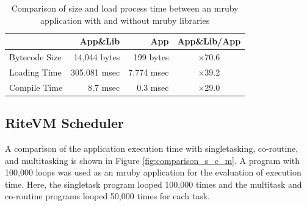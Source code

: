 \documentclass[conference]{IEEEtran/IEEEtran/IEEEtran}
\begin{document}
\begin{table}[t]
    \centering
    \vspace{-2mm}
\caption{Comparison of size and load process time between an mruby application with and without mruby libraries}
    \vspace{-2mm}
    {\tabcolsep=0.3cm
    \begin{tabular}{l||r|r|c}
                            & App\&Lib     & App        &   App\&Lib/App  \\ \hline
          Bytecode Size     & 14,044 bytes & 199 bytes  &   $\times$70.6          \\ %
          Loading Time      & 305.081 msec & 7.774 msec &   $\times$39.2          \\
          Compile Time      & 8.7 msec     & 0.3 msec   &   $\times$29.0          \\
    \end{tabular}
    }
          \vspace{-3mm}
    \label{tab:size_and_time}
\end{table}

\subsection{RiteVM Scheduler}
A comparison of the application execution time with singletasking, co-routine, and multitasking is shown in Figure \ref{fig:comparison_s_c_m}.
A program with 100,000 loops was used as an mruby application for the evaluation of execution time.
Here, the singletask program looped 100,000 times and the multitask and co-routine programs looped 50,000 times for each task.
\end{document}
